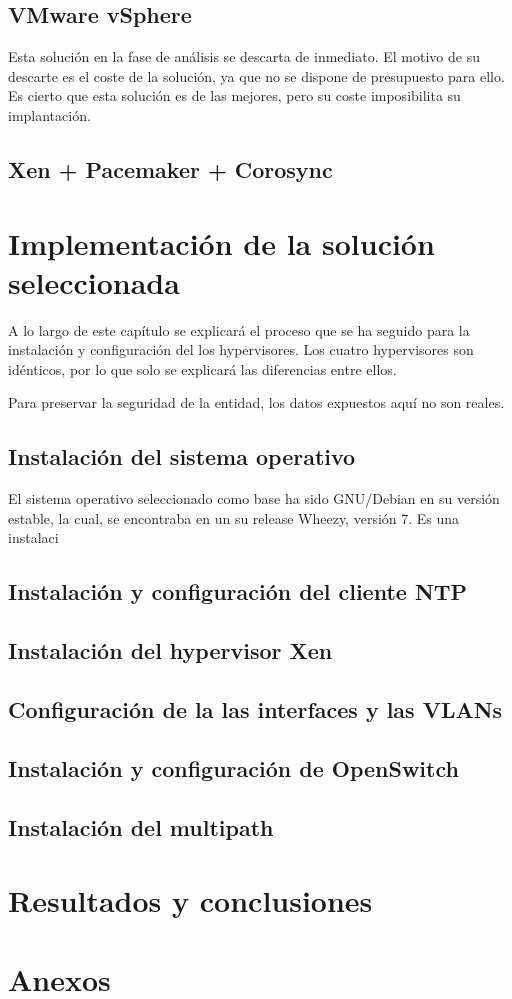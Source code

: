 \documentclass[12pt,a4paper,titlepage,twoside]{report}
\begin{document}
\section{VMware vSphere}

Esta solución en la fase de análisis se descarta de inmediato. El motivo de su descarte es el coste de la solución, ya que no se dispone de presupuesto para ello. Es cierto que esta solución es de las mejores, pero su coste imposibilita su implantación.
\section{Xen + Pacemaker + Corosync}

\chapter{Implementación de la solución seleccionada}
\par A lo largo de este capítulo se explicará el proceso que se ha seguido para la instalación y configuración del los hypervisores. Los cuatro hypervisores son idénticos, por lo que solo se explicará las diferencias entre ellos. 
\par Para preservar la seguridad de la entidad, los datos expuestos aquí no son reales.
\section{Instalación del sistema operativo}
El sistema operativo seleccionado como base ha sido GNU/Debian en su versión estable, la cual, se encontraba en un su release Wheezy, versión 7. Es una instalaci
\section{Instalación y configuración del cliente NTP}
\section{Instalación del hypervisor Xen}
\section{Configuración de la las interfaces y las VLANs}
\section{Instalación y configuración de OpenSwitch}
\section{Instalación del multipath}

\chapter{Resultados y conclusiones}
\chapter{Anexos}

\nocite{*}
\printbibliography
\end{document}
